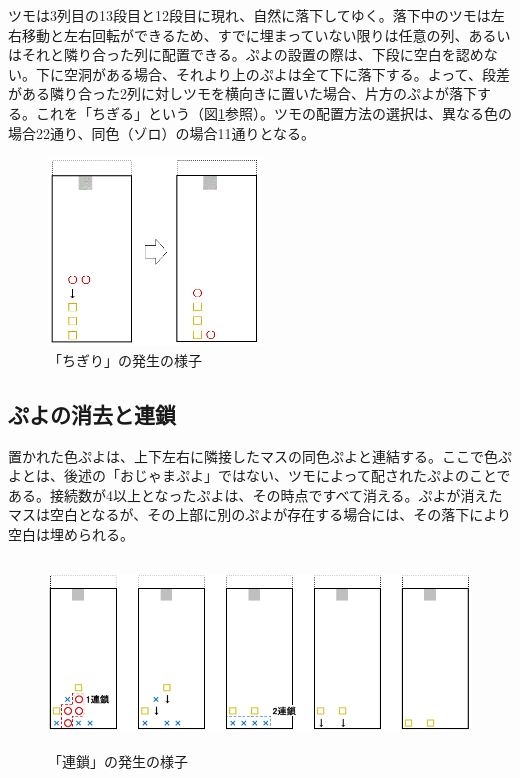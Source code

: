 \documentclass[12pt]{jreport}
\begin{document}
ツモは3列目の13段目と12段目に現れ、自然に落下してゆく。落下中のツモは左右移動と左右回転ができるため、すでに埋まっていない限りは任意の列、あるいはそれと隣り合った列に配置できる。ぷよの設置の際は、下段に空白を認めない。下に空洞がある場合、それより上のぷよは全て下に落下する。よって、段差がある隣り合った2列に対しツモを横向きに置いた場合、片方のぷよが落下する。これを「ちぎる」という（図\ref{fig:tigiri}参照）。ツモの配置方法の選択は、異なる色の場合22通り、同色（ゾロ）の場合11通りとなる。
\begin{figure}[tb]
  \begin{center}
  \includegraphics[height=5cm]{img/tigiri.png}
  \caption{「ちぎり」の発生の様子} \label{fig:tigiri}
\end{center}
\end{figure}

\subsection{ぷよの消去と連鎖} \label{del_chain}
置かれた色ぷよは、上下左右に隣接したマスの同色ぷよと連結する。ここで色ぷよとは、後述の「おじゃまぷよ」ではない、ツモによって配されたぷよのことである。接続数が4以上となったぷよは、その時点ですべて消える。ぷよが消えたマスは空白となるが、その上部に別のぷよが存在する場合には、その落下により空白は埋められる。

\begin{figure}[tb]
  \begin{center}
  \includegraphics[height=5cm]{img/rensa.png}
  \caption{「連鎖」の発生の様子} \label{fig:rensa}
\end{center}
\end{figure}
\end{document}
